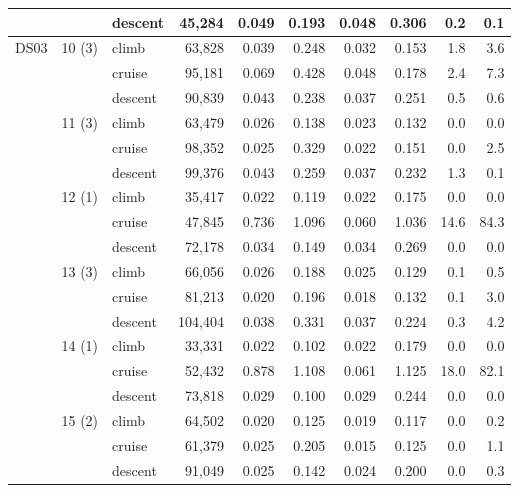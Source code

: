 \begin{scriptsize}
\begin{longtable}{lllrrrrrrr}
 &  & descent & 45,284 & 0.049 & 0.193 & 0.048 & 0.306 & 0.2 & 0.1 \\
\midrule
DS03 & 10 (3) & climb & 63,828 & 0.039 & 0.248 & 0.032 & 0.153 & 1.8 & 3.6 \\
 &  & cruise & 95,181 & 0.069 & 0.428 & 0.048 & 0.178 & 2.4 & 7.3 \\
 &  & descent & 90,839 & 0.043 & 0.238 & 0.037 & 0.251 & 0.5 & 0.6 \\
 & 11 (3) & climb & 63,479 & 0.026 & 0.138 & 0.023 & 0.132 & 0.0 & 0.0 \\
 &  & cruise & 98,352 & 0.025 & 0.329 & 0.022 & 0.151 & 0.0 & 2.5 \\
 &  & descent & 99,376 & 0.043 & 0.259 & 0.037 & 0.232 & 1.3 & 0.1 \\
 & 12 (1) & climb & 35,417 & 0.022 & 0.119 & 0.022 & 0.175 & 0.0 & 0.0 \\
 &  & cruise & 47,845 & 0.736 & 1.096 & 0.060 & 1.036 & 14.6 & 84.3 \\
 &  & descent & 72,178 & 0.034 & 0.149 & 0.034 & 0.269 & 0.0 & 0.0 \\
 & 13 (3) & climb & 66,056 & 0.026 & 0.188 & 0.025 & 0.129 & 0.1 & 0.5 \\
 &  & cruise & 81,213 & 0.020 & 0.196 & 0.018 & 0.132 & 0.1 & 3.0 \\
 &  & descent & 104,404 & 0.038 & 0.331 & 0.037 & 0.224 & 0.3 & 4.2 \\
 & 14 (1) & climb & 33,331 & 0.022 & 0.102 & 0.022 & 0.179 & 0.0 & 0.0 \\
 &  & cruise & 52,432 & 0.878 & 1.108 & 0.061 & 1.125 & 18.0 & 82.1 \\
 &  & descent & 73,818 & 0.029 & 0.100 & 0.029 & 0.244 & 0.0 & 0.0 \\
 & 15 (2) & climb & 64,502 & 0.020 & 0.125 & 0.019 & 0.117 & 0.0 & 0.2 \\
 &  & cruise & 61,379 & 0.025 & 0.205 & 0.015 & 0.125 & 0.0 & 1.1 \\
 &  & descent & 91,049 & 0.025 & 0.142 & 0.024 & 0.200 & 0.0 & 0.3 \\
\end{longtable}
\end{scriptsize}
